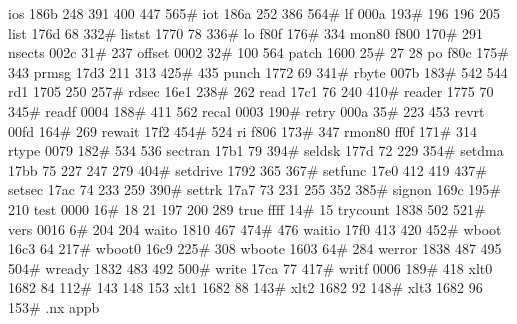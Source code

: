 ios             186b    248     391     400     447     565#
iot             186a    252     386     564#
lf              000a    193#    196     196     205
list            176d     68     332#
listst          1770     78     336#
lo              f80f    176#    334
mon80           f800    170#    291
nsects          002c     31#    237
offset          0002     32#    100     564
patch           1600     25#     27      28
po              f80c    175#    343
prmsg           17d3    211     313     425#    435
punch           1772     69     341#
rbyte           007b    183#    542     544
rd1             1705    250     257#
rdsec           16e1    238#    262
read            17c1     76     240     410#
reader          1775     70     345#
readf           0004    188#    411     562
recal           0003    190#
retry           000a     35#    223     453
revrt           00fd    164#    269
rewait          17f2    454#    524
ri              f806    173#    347
rmon80          ff0f    171#    314
rtype           0079    182#    534     536
sectran         17b1     79     394#
seldsk          177d     72     229     354#
setdma          17bb     75     227     247     279     404#
setdrive        1792    365     367#
setfunc         17e0    412     419     437#
setsec          17ac     74     233     259     390#
settrk          17a7     73     231     255     352     385#
signon          169c    195#    210
test            0000     16#     18      21     197     200     289
true            ffff     14#     15
trycount        1838    502     521#
vers            0016      6#    204     204
waito           1810    467     474#    476
waitio          17f0    413     420     452#
wboot           16c3     64     217#
wboot0          16c9    225#    308
wboote          1603     64#    284
werror          1838    487     495     504#
wready          1832    483     492     500#
write           17ca     77     417#
writf           0006    189#    418
xlt0            1682     84     112#    143     148     153
xlt1            1682     88     143#
xlt2            1682     92     148#
xlt3            1682     96     153#
.nx appb

